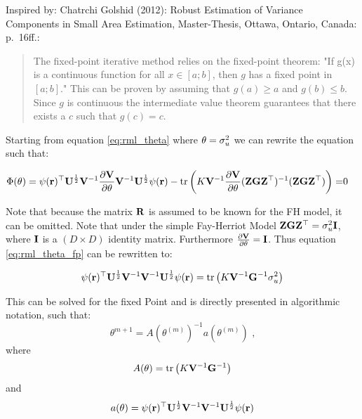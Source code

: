 Inspired by: Chatrchi Golshid (2012): Robust Estimation of Variance
Components in Small Area Estimation, Master-Thesis, Ottawa, Ontario,
Canada: p.~16ff.:

\begin{quote}
The fixed-point iterative method relies on the fixed-point theorem: "If g(x) is 
a continuous function for all $x \in [a; b]$, then $g$ has a fixed point in $[a;
b]$." This can be proven by assuming that $g(a)\geq a$ and $g(b)\leq b$. Since 
$g$ is continuous the intermediate value theorem guarantees that there exists a 
$c$ such that $g(c) = c$.
\end{quote}

Starting from equation \ref{eq:rml_theta} where $\theta = \sigma_{u}^2$ we can
rewrite the equation such that:

\begin{align}
\label{eq:rml_theta_fp}
\Phi(\theta) = \psi(\mathbf{r})^\top \mathbf{U}^{\frac{1}{2}}\mathbf{V}^{-1}\frac{\partial\mathbf{V}}{\partial\theta}\mathbf{V}^{-1}\mathbf{U}^{\frac{1}{2}} \psi(\mathbf{r}) - \operatorname{tr}\left(K\mathbf{V}^{-1}\frac{\partial\mathbf{V}}{\partial\theta} (\mathbf{Z}\mathbf{G}\mathbf{Z}^\top)^{-1} (\mathbf{Z}\mathbf{G}\mathbf{Z}^\top)\right) =& 0
\end{align}

Note that because the matrix $\mathbf{R}$ is assumed to be known for the FH
model, it can be omitted. Note that under the simple Fay-Herriot Model
$\mathbf{Z}\mathbf{G}\mathbf{Z}^\top = \sigma_{u}^2\mathbf{I}$, where $\mathbf{I}$ is a
$(D \times D)$ identity matrix. Furthermore
$\frac{\partial\mathbf{V}}{\partial\theta} = \mathbf{I}$. Thus equation
\ref{eq:rml_theta_fp} can be rewritten to:

\begin{align*}
\psi(\mathbf{r})^\top\mathbf{U}^{\frac{1}{2}}\mathbf{V}^{-1}\mathbf{V}^{-1}\mathbf{U}^{\frac{1}{2}} \psi(\mathbf{r}) = \operatorname{tr}\left(K\mathbf{V}^{-1}\mathbf{G}^{-1} \sigma_{u}^2 \right)
\end{align*}

This can be solved for the fixed Point and is directly presented in
algorithmic notation, such that: \[
\theta^{m+1} = A(\theta^{(m)})^{-1} a(\theta^{(m)}) \text{ ,}
\] where \[
A(\theta) = \operatorname{tr}\left(K\mathbf{V}^{-1}\mathbf{G}^{-1} \right)
\] and
\[a(\theta) = \psi(\mathbf{r})^\top\mathbf{U}^{\frac{1}{2}}\mathbf{V}^{-1}\mathbf{V}^{-1}\mathbf{U}^{\frac{1}{2}} \psi(\mathbf{r})
\]
